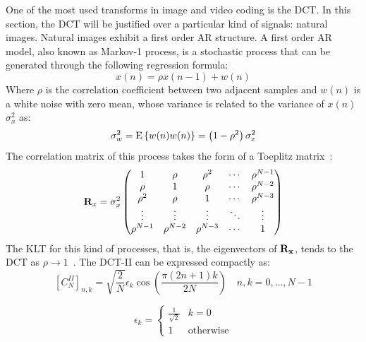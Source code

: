 \documentclass[11pt,a4paper,openright,twoside]{book}
\numberwithin{equation}{section} %
\numberwithin{figure}{section} %
\numberwithin{table}{section} %
\begin{document}
One of the most used transforms in image and video coding is the
\ac{DCT}.
In this section, the \ac{DCT} will be justified over a particular kind
of signals: natural images.
Natural images exhibit a first order \ac{AR} structure.
A first order \ac{AR} model, also known as Markov-1 process, is a
stochastic process that can be generated through the following
regression formula:
\begin{equation}
	x(n) = \rho x(n-1) + w(n)
	\label{eqn:first_order_ar_model}
\end{equation}
Where $\rho$ is the correlation coefficient between two adjacent samples
and $w(n)$ is a white noise with zero mean, whose variance is related to
the variance of $x(n)$ $\sigma_x^2$ as:
\begin{equation}
	\sigma_w^2 = \text{E}\left\{ w(n) w(n) \right\} =
	\left(1-\rho^2\right)\sigma_x^2
\end{equation}
The correlation matrix of this process takes the form of a Toeplitz
matrix~\cite{akansu-12-toeplitz-approximation}:
\begin{equation}
	\mathbf{R}_x = \sigma_x^2
	\begin{pmatrix}
		1          & \rho       & \rho^2     & \cdots & \rho^{N-1} \\
		\rho       & 1          & \rho       & \cdots & \rho^{N-2} \\
		\rho^2     & \rho       & 1          & \cdots & \rho^{N-3} \\
		\vdots     & \vdots     & \vdots     & \ddots & \vdots     \\
		\rho^{N-1} & \rho^{N-2} & \rho^{N-3} & \cdots & 1
	\end{pmatrix}
	\label{eqn:toeplitz_matrix}
\end{equation}
The \ac{KLT} for this kind of processes, that is, the eigenvectors of
$\mathbf{R}_{\mathbf{x}}$, tends to the \ac{DCT} as $\rho\to1$~\cite{britanak-06-dct-and-dst}.
The \ac{DCT}-II can be expressed compactly as:
\begin{equation}
	{\left[C_{N}^{II} \right]}_{n,k} =
	\sqrt{\frac{2}{N}}\epsilon_k\cos\left(\frac{\pi(2n+1)k}{2N}\right)
	\quad
	n,k=0,\dots,N-1
	\label{eqn:dct_ii}
\end{equation}

\begin{equation}
	\epsilon_k =
	\begin{cases}
		\frac{1}{\sqrt{2}} & k = 0 \\
		1 & \text{otherwise}
	\end{cases}
\end{equation}
\end{document}
